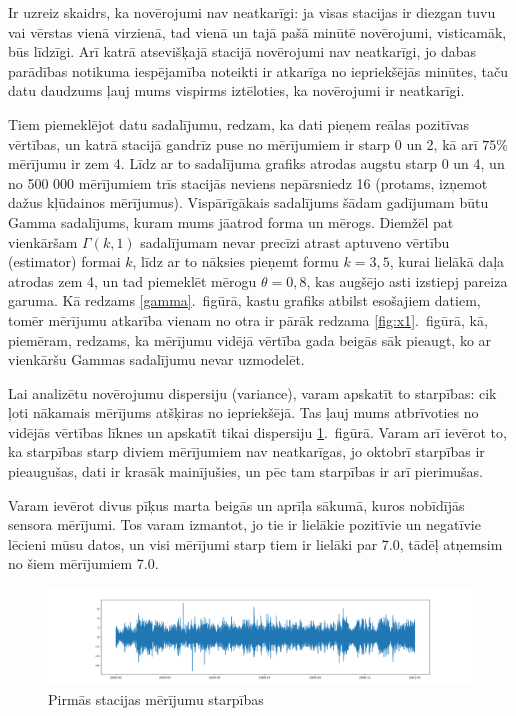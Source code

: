 \documentclass[12pt,a4paper]{article}
\begin{document}
Ir uzreiz skaidrs, ka novērojumi nav neatkarīgi: ja visas stacijas ir diezgan tuvu vai vērstas vienā virzienā, tad vienā un tajā pašā minūtē novērojumi, visticamāk, būs līdzīgi. Arī katrā atsevišķajā stacijā novērojumi nav neatkarīgi, jo dabas parādības notikuma iespējamība noteikti ir atkarīga no iepriekšējās minūtes, taču datu daudzums ļauj mums vispirms iztēloties, ka novērojumi ir neatkarīgi.

Tiem piemeklējot datu sadalījumu, redzam, ka dati pieņem reālas pozitīvas vērtības, un katrā stacijā gandrīz puse no mērījumiem ir starp 0 un 2, kā arī \(75\%\) mērījumu ir zem 4. Līdz ar to sadalījuma grafiks atrodas augstu starp 0 un 4, un no 500 000 mērījumiem trīs stacijās neviens nepārsniedz 16 (protams, izņemot dažus kļūdainos mērījumus). Vispārīgākais sadalījums šādam gadījumam būtu Gamma sadalījums, kuram mums jāatrod forma un mērogs. 
Diemžēl pat vienkāršam \(\Gamma(k, 1)\) sadalījumam nevar precīzi atrast aptuveno vērtību (estimator) formai \(k\), līdz ar to nāksies pieņemt formu \(k=3,5\), kurai lielākā daļa atrodas zem 4, un tad piemeklēt mērogu \(\theta=0,8\), kas augšējo asti izstiepj pareiza garuma. Kā redzams \ref{gamma}.~figūrā, kastu grafiks atbilst esošajiem datiem, tomēr mērījumu atkarība vienam no otra ir pārāk redzama \ref{fig:x1}.~figūrā, kā, piemēram, redzams, ka mērījumu vidējā vērtība gada beigās sāk pieaugt, ko ar vienkāršu Gammas sadalījumu nevar uzmodelēt.

Lai analizētu novērojumu dispersiju (variance), varam apskatīt to starpības: cik ļoti nākamais mērījums atšķiras no iepriekšējā. Tas ļauj mums atbrīvoties no vidējās vērtības līknes un apskatīt tikai dispersiju \ref{fig:starpibas}.~figūrā. 
Varam arī ievērot to, ka starpības starp diviem mērījumiem nav neatkarīgas, jo oktobrī starpības ir pieaugušas, dati ir krasāk mainījušies, un pēc tam starpības ir arī pierimušas.

Varam ievērot divus pīķus marta beigās un aprīļa sākumā, kuros nobīdījās sensora mērījumi. Tos varam izmantot, jo tie ir lielākie pozitīvie un negatīvie lēcieni mūsu datos, un visi mērījumi starp tiem ir lielāki par 7.0, tādēļ atņemsim no šiem mērījumiem 7.0.

\begin{figure}[ht!]
    \centering
    \includegraphics[width=14cm]{starpibas.png}
    \caption{Pirmās stacijas mērījumu starpības}\label{fig:starpibas}
\end{figure}
\end{document}
